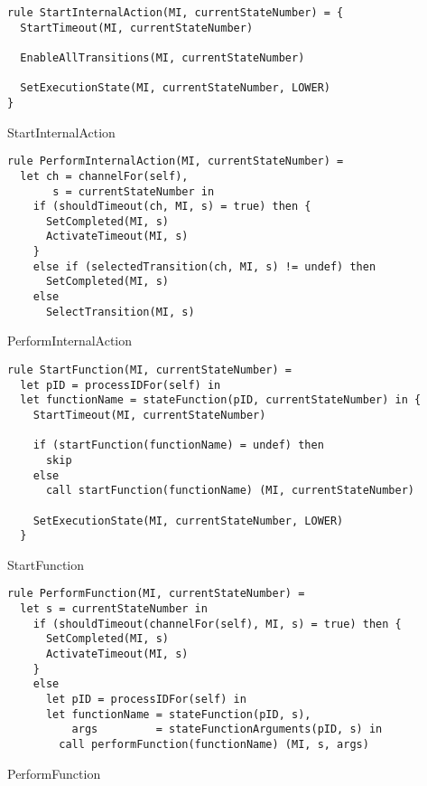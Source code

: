 \begin{listing}[H]
\begin{verbatim}
rule StartInternalAction(MI, currentStateNumber) = {
  StartTimeout(MI, currentStateNumber)

  EnableAllTransitions(MI, currentStateNumber)

  SetExecutionState(MI, currentStateNumber, LOWER)
}
\end{verbatim}
\caption{StartInternalAction}
\label{lst:asm:StartInternalAction}
\end{listing}




\begin{listing}[H]
\begin{verbatim}
rule PerformInternalAction(MI, currentStateNumber) =
  let ch = channelFor(self),
       s = currentStateNumber in
    if (shouldTimeout(ch, MI, s) = true) then {
      SetCompleted(MI, s)
      ActivateTimeout(MI, s)
    }
    else if (selectedTransition(ch, MI, s) != undef) then
      SetCompleted(MI, s)
    else
      SelectTransition(MI, s)
\end{verbatim}
\caption{PerformInternalAction}
\label{lst:asm:PerformInternalAction}
\end{listing}






\begin{listing}[H]
\begin{verbatim}
rule StartFunction(MI, currentStateNumber) =
  let pID = processIDFor(self) in
  let functionName = stateFunction(pID, currentStateNumber) in {
    StartTimeout(MI, currentStateNumber)

    if (startFunction(functionName) = undef) then
      skip
    else
      call startFunction(functionName) (MI, currentStateNumber)

    SetExecutionState(MI, currentStateNumber, LOWER)
  }
\end{verbatim}
\caption{StartFunction}
\label{lst:asm:StartFunction}
\end{listing}




\begin{listing}[H]
\begin{verbatim}
rule PerformFunction(MI, currentStateNumber) =
  let s = currentStateNumber in
    if (shouldTimeout(channelFor(self), MI, s) = true) then {
      SetCompleted(MI, s)
      ActivateTimeout(MI, s)
    }
    else
      let pID = processIDFor(self) in
      let functionName = stateFunction(pID, s),
          args         = stateFunctionArguments(pID, s) in
        call performFunction(functionName) (MI, s, args)
\end{verbatim}
\caption{PerformFunction}
\label{lst:asm:PerformFunction}
\end{listing}




